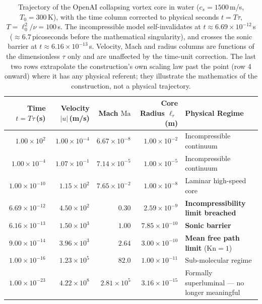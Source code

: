 \documentclass[11pt,a4paper]{article}
\begin{document}
\begin{table}[htbp]
\centering
\footnotesize
\setlength{\tabcolsep}{3.5pt}
\begin{tabular}{@{}r r r r >{\raggedright\arraybackslash}p{3.4cm}@{}}
\toprule
\textbf{Time} $t=T\tau$\,(s) & \textbf{Velocity} $|u|$\,(m/s) & \textbf{Mach} $\text{Ma}$ & \textbf{Core Radius} $\ell_r$\,(m) & \textbf{Physical Regime} \\
\midrule
$1.00 \times 10^{2}$   & $1.00 \times 10^{-4}$ & $6.67 \times 10^{-8}$ & $1.00 \times 10^{-2}$ & Incompressible continuum \\
$1.00 \times 10^{-4}$  & $1.07 \times 10^{-1}$ & $7.14 \times 10^{-5}$ & $1.00 \times 10^{-5}$ & Incompressible continuum \\
$1.00 \times 10^{-10}$ & $1.15 \times 10^{2}$  & $7.65 \times 10^{-2}$ & $1.00 \times 10^{-8}$ & Laminar high-speed core \\
$6.69 \times 10^{-12}$ & $4.50 \times 10^{2}$  & $\mathbf{0.30}$       & $2.59 \times 10^{-9}$ & \textbf{Incompressibility limit breached} \\
$6.16 \times 10^{-13}$ & $1.50 \times 10^{3}$  & $\mathbf{1.00}$       & $7.85 \times 10^{-10}$ & \textbf{Sonic barrier} \\
$9.00 \times 10^{-14}$ & $3.96 \times 10^{3}$  & $2.64$               & $3.00 \times 10^{-10}$ & \textbf{Mean free path limit} ($\mathrm{Kn}=1$) \\
$1.00 \times 10^{-16}$ & $1.23 \times 10^{5}$  & $82.0$               & $1.00 \times 10^{-11}$ & Sub-molecular regime \\
$1.00 \times 10^{-23}$ & $4.22 \times 10^{8}$  & $2.81 \times 10^{5}$ & $3.16 \times 10^{-15}$ & Formally superluminal --- no longer meaningful \\
\bottomrule
\end{tabular}
\caption{Trajectory of the OpenAI collapsing vortex core in water ($c_s = 1500$\,m/s, $T_0 = 300$\,K), with the time column corrected to physical seconds $t=T\tau$, $T=\ell_0^2/\nu=100$\,s. The incompressible model self-invalidates at $t \approx 6.69 \times 10^{-12}$\,s ($\approx6.7$\,picoseconds before the mathematical singularity), and crosses the sonic barrier at $t \approx 6.16 \times 10^{-13}$\,s. Velocity, Mach and radius columns are functions of the dimensionless $\tau$ only and are unaffected by the time-unit correction. The last two rows extrapolate the construction's own scaling law past the point (row 4 onward) where it has any physical referent; they illustrate the mathematics of the construction, not a physical trajectory.}
\label{tab:mach}
\end{table}
\end{document}
